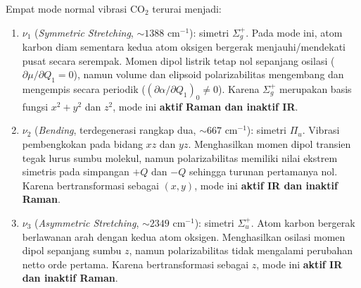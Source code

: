Empat mode normal vibrasi $\text{CO}_2$ terurai menjadi:
\begin{enumerate}
    \item $\nu_1$ (\textit{Symmetric Stretching}, $\sim 1388\text{ cm}^{-1}$): simetri $\Sigma_g^+$. Pada mode ini, atom karbon diam sementara kedua atom oksigen bergerak menjauhi/mendekati pusat secara serempak. Momen dipol listrik tetap nol sepanjang osilasi ($\partial \mu/\partial Q_1 = 0$), namun volume dan elipsoid polarizabilitas mengembang dan mengempis secara periodik ($(\partial \alpha/\partial Q_1)_0 \neq 0$). Karena $\Sigma_g^+$ merupakan basis fungsi $x^2 + y^2$ dan $z^2$, mode ini \textbf{aktif Raman dan inaktif IR}.
    \item $\nu_2$ (\textit{Bending}, terdegenerasi rangkap dua, $\sim 667\text{ cm}^{-1}$): simetri $\Pi_u$. Vibrasi pembengkokan pada bidang $xz$ dan $yz$. Menghasilkan momen dipol transien tegak lurus sumbu molekul, namun polarizabilitas memiliki nilai ekstrem simetris pada simpangan $+Q$ dan $-Q$ sehingga turunan pertamanya nol. Karena bertransformasi sebagai $(x, y)$, mode ini \textbf{aktif IR dan inaktif Raman}.
    \item $\nu_3$ (\textit{Asymmetric Stretching}, $\sim 2349\text{ cm}^{-1}$): simetri $\Sigma_u^+$. Atom karbon bergerak berlawanan arah dengan kedua atom oksigen. Menghasilkan osilasi momen dipol sepanjang sumbu $z$, namun polarizabilitas tidak mengalami perubahan netto orde pertama. Karena bertransformasi sebagai $z$, mode ini \textbf{aktif IR dan inaktif Raman}.
\end{enumerate}

\begin{table}[htbp]
\centering
\caption{Karakteristik Mode Vibrasi Normal Molekul Linear $\text{CO}_2$ ($D_{\infty h}$).}
\label{tab:co2_modes}
\end{table}

